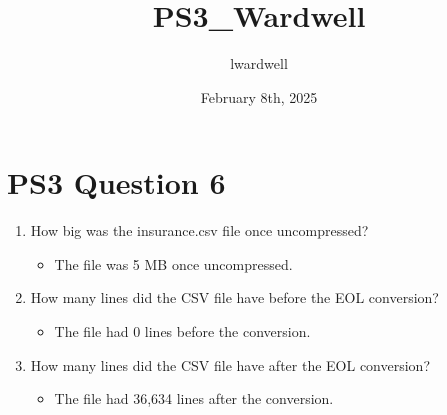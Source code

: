\documentclass{article}
\title{PS3\_Wardwell}
\author{lwardwell }
\date{February 8th, 2025}
\begin{document}
\maketitle

\section*{PS3 Question 6}
\begin{enumerate}
    \item How big was the insurance.csv file once uncompressed?
    \begin{itemize}
        \item The file was 5 MB once uncompressed.
    \end{itemize}
    \item How many lines did the CSV file have before the EOL conversion?
    \begin{itemize}
        \item The file had 0 lines before the conversion.
    \end{itemize}
    \item How many lines did the CSV file have after the EOL conversion?
    \begin{itemize}
        \item The file had 36,634 lines after the conversion.
    \end{itemize}
\end{enumerate}
\end{document}
